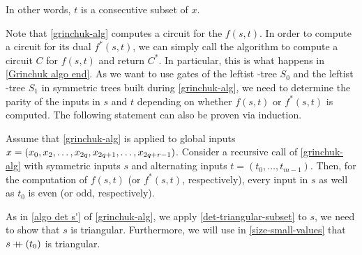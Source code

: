 In other words, $t$ is a consecutive subset of $x$.

Note that \cref{grinchuk-alg} computes a circuit for the \aop{} $f(s, t)$.
In order to compute a circuit for its dual $f^*(s, t)$,
we can simply call the algorithm to compute a circuit $C$ for $f(s, t)$ and return $C^*$.
In particular, this is what happens in \cref{Grinchuk algo end}.
As we want to use gates of the leftist \AND{}-tree $S\!_0$ and
the leftist \OR{}-tree $S\!_1$ in symmetric trees built during \cref{grinchuk-alg},
we need to determine the parity of the inputs in $s$ and $t$
depending on whether $f(s, t)$ or $f^*(s, t)$ is computed.
The following statement can also be proven via induction.

\begin{qedlemma} \label{grinchuk-even-odd}
 Assume that \cref{grinchuk-alg} is applied to global inputs $x = ({x_0, x_2, \dotsc, x_{2q}, x_{2q+1}, \dotsc, x_{2q + r - 1}})$.
 Consider a recursive call of \cref{grinchuk-alg} with symmetric inputs $s$
 and alternating inputs $t = (t_0, \dotsc, t_{m-1})$.
 Then, for the computation of $f(s, t)$ (or $f^*(s, t)$, respectively),
 every input in $s$ as well as $t_0$ is even (or odd, respectively).
 \end{qedlemma}

As in \cref{algo det s'} of \cref{grinchuk-alg}, we apply \cref{det-triangular-subset} to $s$,
we need to show that $s$ is triangular.
Furthermore, we will use in \cref{size-small-values} that $s \mathbin{+\mkern-8mu+} (t_0)$ is triangular.

